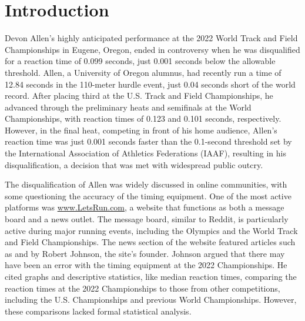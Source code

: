 \documentclass[12pt, letterpaper]{article}
\begin{document}
\doublespace


\section{Introduction}
\label{sec:intro}

Devon Allen’s highly anticipated performance at the 2022 World 
Track and Field Championships in Eugene, Oregon, ended in 
controversy when he was disqualified for a reaction time of 
0.099 seconds, just 0.001 seconds below the allowable threshold.
Allen, a University of Oregon alumnus, 
had recently run a time of 12.84 seconds in the 110-meter hurdle 
event, just 0.04 seconds short of the world record. After placing 
third at the U.S. Track and Field Championships, he advanced 
through the preliminary heats and semifinals at the World 
Championships, with reaction times of 0.123 and 0.101 seconds, 
respectively. However, in the final heat, competing in front of his 
home audience, Allen’s reaction time was just 0.001 seconds faster 
than the 0.1-second threshold set by the International Association 
of Athletics Federations (IAAF), resulting in his disqualification, a 
decision that was met with widespread public outcry.


The disqualification of Allen was widely discussed in online 
communities, with some questioning the accuracy of the timing 
equipment. One of the most active platforms was \url{www.LetsRun.com}, 
a website that functions as both a message board and a news outlet. 
The message board, similar to Reddit, is particularly active during 
major running events, including the Olympics and the World Track 
and Field Championships. The news section of the website featured 
articles such as \citet{johnson2022data} and \citet{johnson2022was} 
by Robert Johnson, the site’s founder. Johnson argued that there may 
have been an error with the timing equipment at the 2022 Championships. 
He cited graphs and descriptive statistics, like median reaction 
times, comparing the reaction times at the 2022 Championships to 
those from other competitions, including the U.S. Championships and 
previous World Championships. However, these comparisons lacked formal 
statistical analysis. 
\end{document}
